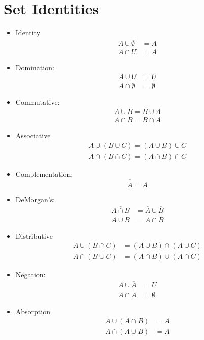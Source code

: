\documentclass{article}
\theoremstyle{mytheoremstyle}
\theoremstyle{mytheoremstyle}
\theoremstyle{myproblemstyle}
\begin{document}
    \section*{Set Identities}
    \begin{itemize}
        \item Identity
            \begin{align*}
                A\cup \emptyset &= A \\
                A\cap U &= A
            \end{align*}
        \item Domination:
            \begin{align*}
                A\cup U &= U \\
                A\cap \emptyset &= \emptyset
            \end{align*}
        \item Commutative:
            \begin{align*}
                A \cup B = B \cup A \\
                A \cap B = B \cap A
            \end{align*}
        \item Associative
            \begin{align*}
                A \cup (B \cup C) = (A \cup B) \cup C \\
                A \cap (B \cap C) = (A \cap B) \cap C
            \end{align*}
        \item Complementation:
            \[
                \overline{\overline{A}} = A
            \]
        \item DeMorgan's:
            \begin{align*}
                \overline{A\cap B} &= \overline{A} \cup \overline{B} \\
                \overline{A\cup B} &= \overline{A} \cap \overline{B}
            \end{align*}
        \item Distributive
            \begin{align*}
                A\cup (B\cap C) &= (A\cup B) \cap (A\cup C) \\
                A\cap (B\cup C) &= (A\cap B) \cup (A\cap C)
            \end{align*}
        \item Negation:
            \begin{align*}
                A\cup\overline{A}&=U \\
                A\cap\overline{A}&=\emptyset
            \end{align*}
        \item Absorption
            \begin{align*}
                A\cup(A\cap B) &= A \\
                A\cap(A\cup B) &= A \\
            \end{align*}
    \end{itemize}
\end{document}
